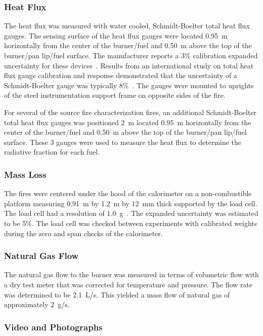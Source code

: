 \documentclass[twoside]{uocthesis}
\begin{document}
{\subsubsection{Heat Flux}

The heat flux was measured with water cooled, Schmidt-Boelter total heat flux gauges. The sensing surface of the heat flux gauges were located 0.95~m horizontally from the center of the burner/fuel and 0.50~m above the top of the burner/pan lip/fuel surface.  The manufacturer reports a 3\% calibration expanded uncertainty for these devices~\cite{Medtherm}. Results from an international study on total heat flux gauge calibration and response demonstrated that the uncertainty of a Schmidt-Boelter gauge was typically 8\%~\cite{Pitts:2006}.  The gauges were mounted to uprights of the steel instrumentation support frame on opposite sides of the fire. 

For several of the source fire characterization fires, an additional Schmidt-Boelter total heat flux gauges was positioned 2~m located 0.95~m horizontally from the center of the burner/fuel and 0.50~m above the top of the burner/pan lip/fuel surface.  These 3 gauges were used to measure the heat flux to determine the radiative fraction for each fuel. 

\subsubsection{Mass Loss}

The fires were centered under the hood of the calorimeter on a non-combustible platform measuring 0.91~m by 1.2~m by 12~mm thick supported by the load cell.  The load cell had a resolution of 1.0~g~\cite{Mettler}. The expanded uncertainty was estimated to be 5\%.  The load cell was checked between experiments with calibrated weights during the zero and span checks of the calorimeter.

\subsubsection{Natural Gas Flow}

The natural gas flow to the burner was measured in terms of volumetric flow with a dry test meter that was corrected for temperature and pressure. The flow rate was determined to be 2.1~L/s.  This yielded a mass flow of natural gas of approximately 2~g/s.  

\subsubsection{Video and Photographs}

}
\end{document}

